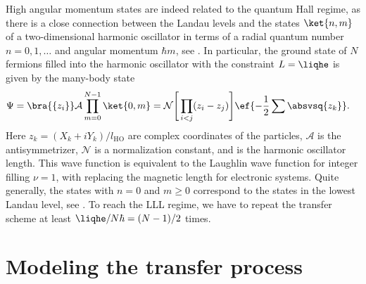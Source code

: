 High angular momentum states are indeed related to the quantum Hall regime, as there is a close connection between the Landau levels and the states $\ket{n,m}$ of a two-dimensional harmonic oscillator in terms of a radial quantum number $n=0,1,\dots$ and angular momentum $\hbar m$, see . In particular, the ground state of $N$ fermions filled into the harmonic oscillator with the constraint $L=\liqhe$ is given by the many-body state
\begin{align}
\Psi&= \bra{\{z_i\}}\mathcal{A} \prod_{m=0}^{N-1} \ket{0,m} = \mathcal{N}\Bigg[\prod_{i<j} (z_i-z_j) \Bigg] \ef{-\frac{1}{2}\sum\absvsq{z_k}}.
\end{align}
Here $z_k=(X_k+i Y_k)/l_\text{HO}$ are complex coordinates of the particles, $\mathcal{A}$ is the antisymmetrizer, $\mathcal{N}$ is a normalization constant, and  is the harmonic oscillator length. This wave function is equivalent to the Laughlin wave function for integer filling $\nu=1$, with    replacing the magnetic length  for electronic systems. Quite generally, the states with $n=0$ and $m\ge 0$ correspond to the states in the lowest Landau level, see .
To reach the LLL regime, we have to repeat the transfer scheme at least $\liqhe/N\hbar=(N-1)/2$ times.

\section{Modeling the transfer process}


